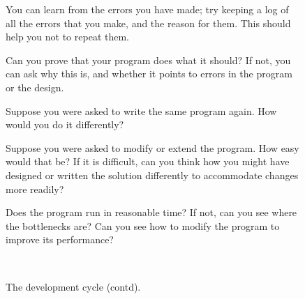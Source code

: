 \begin{figure}
\itemstart
You can learn
from the errors you have made; try keeping a log of
all the errors that you make, and the reason for them. This should help you not to
repeat them.
 
\itemstart
Can you prove that your program does what it should? If not, you can ask
why this is, and whether it points to errors in the program or the
design.

\itemstart
Suppose you were asked to write the same program again. How would you do it
differently?

\itemstart
Suppose you were asked to modify or extend the program. How easy would
that be? If it is difficult, can you think how you might have designed
or written the solution differently to accommodate changes more readily?

\itemstart
Does the program run in reasonable time? If not, can you see where the
bottlenecks are? Can you see how to modify the program to improve its
performance?

\smallskip
\hspace*{0cm}\hrulefill\\
\caption{The development cycle (contd).}
\label{devCycle2}
\end{figure}

